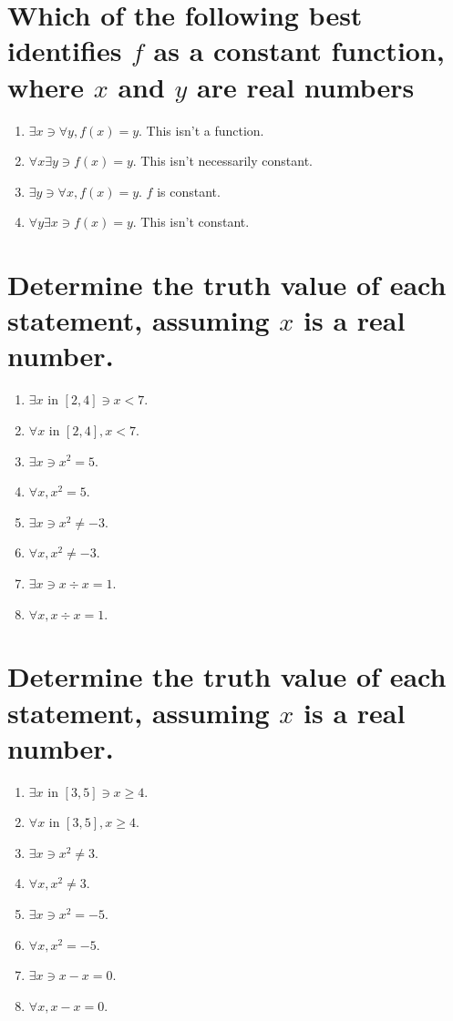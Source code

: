 \documentclass[11pt]{article} %
\begin{document}
\section{Which of the following best identifies $f$ as a constant function, where $x$ and $y$ are real numbers}
\begin{enumerate}
\item $\exists x \ni \forall y, f(x)=y$.
\subitem This isn't a function.
\item $\forall x \exists y \ni f(x) = y$.
\subitem This isn't necessarily constant.
\item $\exists y \ni \forall x, f(x) = y$.
\subitem $f$ is constant.
\item $\forall y \exists x \ni f(x) = y$.
\subitem This isn't constant.
\end{enumerate}

\section{Determine the truth value of each statement, assuming $x$ is a real number.}
\begin{enumerate}
\item $\exists x$ in $\left[ 2,4 \right] \ni x<7$.
\item $\forall x$ in $\left[ 2,4 \right], x<7$.
\item $\exists x \ni x^2=5$.
\item $\forall x, x^2=5$.
\item $\exists x \ni x^2 \neq -3$.
\item $\forall x, x^2 \neq -3$.
\item $\exists x \ni x \div x = 1$.
\item $\forall x, x \div x = 1$.
\end{enumerate}

\section{Determine the truth value of each statement, assuming $x$ is a real number.}
\begin{enumerate}
\item $\exists x$ in $\left[ 3,5 \right]\ni x\geq4$.
\item $\forall x$ in $\left[ 3,5 \right], x\geq4$.
\item $\exists x \ni x^2 \neq 3$.
\item $\forall x, x^2 \neq 3$.
\item $\exists x \ni x^2 = -5$.
\item $\forall x, x^2 = -5$.
\item $\exists x \ni x-x=0$.
\item $\forall x, x-x=0$.
\end{enumerate}
\end{document}

